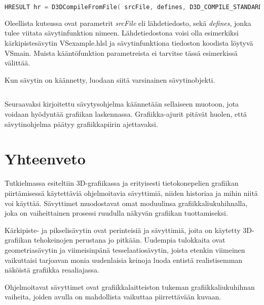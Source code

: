 \documentclass[finnish]{tktltiki2}
\theoremstyle{definition}
\theoremstyle{remark}
\begin{document}
\lstset{breaklines=true}
\begin{lstlisting}[language=c++, basicstyle = \small]
HRESULT hr = D3DCompileFromFile( srcFile, defines, D3D_COMPILE_STANDARD_FILE_INCLUDE, entryPoint, profile, flags, 0, &shaderBlob, &errorBlob );
\end{lstlisting}

Oleellista kutsussa ovat parametrit \emph{srcFile} eli lähdetiedosto, sekä \emph{defines}, jonka tulee viitata sävytinfunktion nimeen. Lähdetiedostona voisi olla esimerkiksi kärkipistesävytin VSexample.hlsl ja sävytinfunktiona tiedoston koodista löytyvä VSmain. Muista kääntöfunktion parametreista ei tarvitse tässä esimerkissä välittää.

Kun sävytin on käännetty, luodaan siitä varsinainen sävytinobjekti. 

\lstset{breaklines=true}
\begin{lstlisting}[language=c++, basicstyle = \small]

\end{lstlisting}

Seuraavaksi kirjoitettu sävytysohjelma käännetään sellaiseen muotoon, jota voidaan hyödyntää grafiikan laskennassa. Grafiikka-ajurit pitävät huolen, että sävytinohjelma päätyy grafiikkapiirin ajettavaksi.


\section{Yhteenveto}

Tutkielmassa esiteltiin 3D-grafiikassa ja erityisesti tietokonepelien grafiikan piirtämisessä käytettäviä ohjelmoitavia sävyttimiä, niiden historiaa ja mihin niitä voi käyttää. Sävyttimet muodostavat omat moduulinsa grafiikkaliukuhihnalla, joka on vaiheittainen prosessi ruudulla näkyvän grafiikan tuottamiseksi. 

Kärkipiste- ja pikselisävytin ovat perinteisiä ja sävyttimiä, joita on käytetty 3D-grafiikan tehokeinojen perustana jo pitkään. Uudempia tulokkaita ovat geometriasävytin ja viimeisinpänä tesselaatiosävytin, joista etenkin viimeinen vaikuttaisi tarjoavan monia uudenlaisia keinoja luoda entistä realistisemman näköistä grafiikka reaaliajassa.

Ohjelmoitavat sävyttimet ovat grafiikkalaitteiston tukeman grafiikkaliukuhihnan vaiheita, joiden avulla on mahdollista vaikuttaa piirrettävään kuvaan.


%
%
% 
%

%






% 
\end{document}
